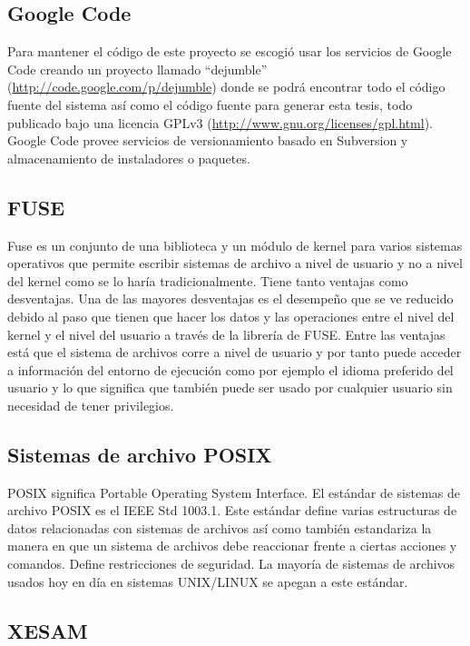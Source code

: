 \subsection{Google Code}

Para mantener el código de este proyecto se escogió usar los servicios de Google Code creando un proyecto llamado ``dejumble'' (\url{http://code.google.com/p/dejumble}) donde se podrá encontrar todo el código fuente del sistema así como el código fuente para generar esta tesis, todo publicado bajo una licencia GPLv3 (\url{http://www.gnu.org/licenses/gpl.html}). Google Code provee servicios de versionamiento basado en Subversion y almacenamiento de instaladores o paquetes. 


\subsection{FUSE}

Fuse es un conjunto de una biblioteca y un módulo de kernel para varios sistemas operativos que permite escribir sistemas de archivo a nivel de usuario y no a nivel del kernel como se lo haría tradicionalmente. Tiene tanto ventajas como desventajas. Una de las mayores desventajas es el desempeño que se ve reducido debido al paso que tienen que hacer los datos y las operaciones entre el nivel del kernel y el nivel del usuario a través de la librería de FUSE. Entre las ventajas está que el sistema de archivos corre a nivel de usuario y por tanto puede acceder a información del entorno de ejecución como por ejemplo el idioma preferido del usuario y lo que significa que también puede ser usado por cualquier usuario sin necesidad de tener privilegios.

\subsection{Sistemas de archivo POSIX}

POSIX significa Portable Operating System Interface. El estándar de sistemas de archivo POSIX es el IEEE Std 1003.1. Este estándar define varias estructuras de datos relacionadas con sistemas de archivos así como también estandariza la manera en que un sistema de archivos debe reaccionar frente a ciertas acciones y comandos. Define restricciones de seguridad. La mayoría de sistemas de archivos usados hoy en día en sistemas UNIX/LINUX se apegan a este estándar.

\subsection{XESAM}

